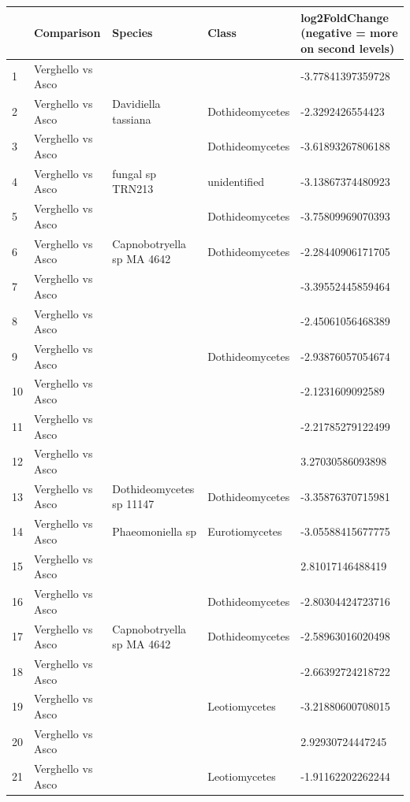 \documentclass[12pt]{article}\usepackage[]{graphicx}\usepackage[]{color}
\numberwithin{figure}{section}
\begin{document}
\begin{table}[ht]
\centering
\begingroup\tiny
\begin{tabular}{lllll}
  \hline
 & Comparison & Species & Class & log2FoldChange 
 (negative = more on second levels) \\ 
  \hline
1 & Verghello vs Asco &  &  & -3.77841397359728 \\ 
  2 & Verghello vs Asco & Davidiella tassiana & Dothideomycetes & -2.3292426554423 \\ 
  3 & Verghello vs Asco &  & Dothideomycetes & -3.61893267806188 \\ 
  4 & Verghello vs Asco & fungal sp TRN213 & unidentified & -3.13867374480923 \\ 
  5 & Verghello vs Asco &  & Dothideomycetes & -3.75809969070393 \\ 
  6 & Verghello vs Asco & Capnobotryella sp MA 4642 & Dothideomycetes & -2.28440906171705 \\ 
  7 & Verghello vs Asco &  &  & -3.39552445859464 \\ 
  8 & Verghello vs Asco &  &  & -2.45061056468389 \\ 
  9 & Verghello vs Asco &  & Dothideomycetes & -2.93876057054674 \\ 
  10 & Verghello vs Asco &  &  & -2.1231609092589 \\ 
  11 & Verghello vs Asco &  &  & -2.21785279122499 \\ 
  12 & Verghello vs Asco &  &  & 3.27030586093898 \\ 
  13 & Verghello vs Asco & Dothideomycetes sp 11147 & Dothideomycetes & -3.35876370715981 \\ 
  14 & Verghello vs Asco & Phaeomoniella sp & Eurotiomycetes & -3.05588415677775 \\ 
  15 & Verghello vs Asco &  &  & 2.81017146488419 \\ 
  16 & Verghello vs Asco &  & Dothideomycetes & -2.80304424723716 \\ 
  17 & Verghello vs Asco & Capnobotryella sp MA 4642 & Dothideomycetes & -2.58963016020498 \\ 
  18 & Verghello vs Asco &  &  & -2.66392724218722 \\ 
  19 & Verghello vs Asco &  & Leotiomycetes & -3.21880600708015 \\ 
  20 & Verghello vs Asco &  &  & 2.92930724447245 \\ 
  21 & Verghello vs Asco &  & Leotiomycetes & -1.91162202262244 \\ 

\end{tabular}
\end{table}
\end{document}
